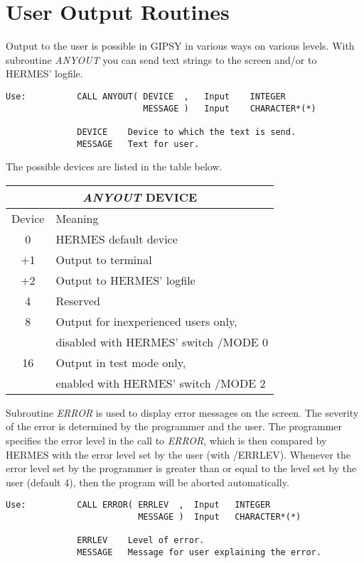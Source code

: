 \section{User Output Routines}

Output to the user is possible in GIPSY in various ways on various
levels.  With subroutine {\sl ANYOUT\/} you can send text
strings to the screen and/or to HERMES' logfile.

\begin{verbatim}
Use:          CALL ANYOUT( DEVICE  ,   Input    INTEGER
                           MESSAGE )   Input    CHARACTER*(*)

              DEVICE    Device to which the text is send.
              MESSAGE   Text for user.
\end{verbatim}

\noindent The possible devices are listed in the
table below.

\begin{center}
\begin{tabular}{|c|l|}
\hline
\multicolumn{2}{|c|}{{\sl ANYOUT\/} DEVICE}\\
\hline
Device&Meaning\\
\hline
0&HERMES default device\\
+1&Output to terminal\\
+2&Output to HERMES' logfile\\
4&Reserved\\
8&Output for inexperienced users only,\\
&disabled with HERMES' switch /MODE 0\\
16&Output in test mode only,\\
&enabled with HERMES' switch /MODE 2\\
\hline
\end{tabular}
\end{center}

Subroutine {\sl ERROR\/} is used to display error messages
on the screen.  The severity of the error is determined by the
programmer and the user.  The programmer specifies the error
level in the call to {\sl ERROR\/}, which is then
compared by HERMES with the error level set by the user (with /ERRLEV).
Whenever the error level set by the programmer is greater than or equal
to the level set by the user (default 4), then the program will be
aborted automatically.

\begin{verbatim}
Use:          CALL ERROR( ERRLEV  ,  Input   INTEGER
                          MESSAGE )  Input   CHARACTER*(*)

              ERRLEV    Level of error.
              MESSAGE   Message for user explaining the error.
\end{verbatim}


